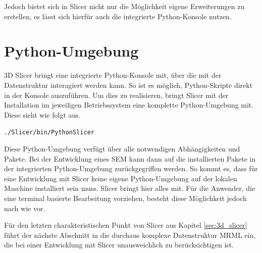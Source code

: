 Jedoch bietet sich in Slicer nicht nur die Möglichkeit eigene Erweiterungen zu
erstellen, es lässt sich hierfür auch die integrierte Python-Konsole nutzen.

\section{Python-Umgebung}
\label{subsec:pythob_umgebung} 3D Slicer bringt eine integrierte Python-Konsole mit,
über die mit der Datenstruktur interagiert werden kann. So ist es möglich,
Python-Skripte direkt in der Konsole auszuführen. Um dies zu realisieren, bringt
Slicer mit der Installation im jeweiligen Betriebssystem eine komplette Python-Umgebung
mit. Diese sieht wie folgt aus.

\begin{center}
	\texttt{./Slicer/bin/PythonSlicer}
\end{center}

Diese Python-Umgebung verfügt über alle notwendigen Abhängigkeiten und Pakete. Bei
der Entwicklung eines \ac{SEM} kann dann auf die installierten Pakete in der
integrierten Python-Umgebung zurückgegriffen werden. So kommt es, dass für eine
Entwicklung mit Slicer keine eigene Python-Umgebung auf der lokalen Maschine
installiert sein muss. Slicer bringt hier alles mit. Für die Anwender, die eine terminal
basierte Bearbeitung vorziehen, besteht diese Möglichkeit jedoch nach wie vor.

Für den letzten charakteristischen Punkt von Slicer aus Kapitel
\ref{sec:3d_slicer} führt der nächste Abschnitt in die durchaus komplexe
Datenstruktur \ac{MRML} ein, die bei einer Entwicklung mit Slicer unausweichlich
zu berücksichtigen ist.

